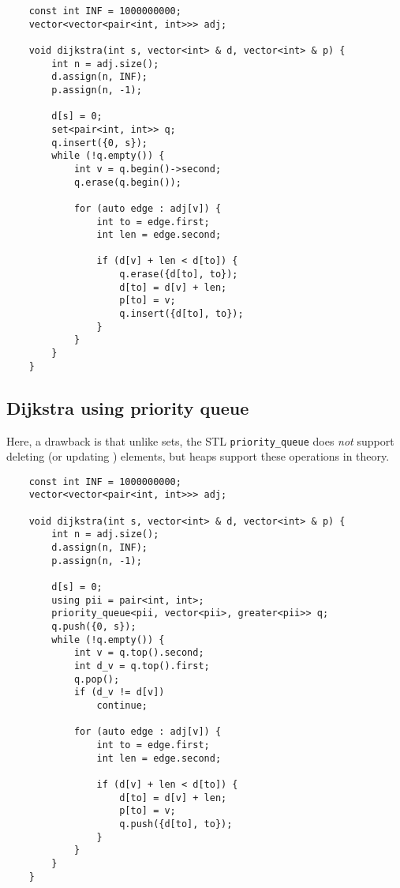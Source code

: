 \documentclass[12pt,a4paper]{amsart}
\numberwithin{equation}{section}
\theoremstyle{definition}
\begin{document}
\begin{lstlisting}
    const int INF = 1000000000;
    vector<vector<pair<int, int>>> adj;

    void dijkstra(int s, vector<int> & d, vector<int> & p) {
        int n = adj.size();
        d.assign(n, INF);
        p.assign(n, -1);

        d[s] = 0;
        set<pair<int, int>> q;
        q.insert({0, s});
        while (!q.empty()) {
            int v = q.begin()->second;
            q.erase(q.begin());
    
            for (auto edge : adj[v]) {
                int to = edge.first;
                int len = edge.second;
    
                if (d[v] + len < d[to]) {
                    q.erase({d[to], to});
                    d[to] = d[v] + len;
                    p[to] = v;
                    q.insert({d[to], to});
                }
            }
        }
    }
\end{lstlisting}

\subsection{Dijkstra using priority queue} Here, a drawback is that unlike sets, the STL \verb|priority_queue| does \textit{not} support deleting (or updating ) elements, but heaps support these operations in theory. 

\begin{lstlisting}
    const int INF = 1000000000;
    vector<vector<pair<int, int>>> adj;

    void dijkstra(int s, vector<int> & d, vector<int> & p) {
        int n = adj.size();
        d.assign(n, INF);
        p.assign(n, -1);

        d[s] = 0;
        using pii = pair<int, int>;
        priority_queue<pii, vector<pii>, greater<pii>> q;
        q.push({0, s});
        while (!q.empty()) {
            int v = q.top().second;
            int d_v = q.top().first;
            q.pop();
            if (d_v != d[v])
                continue;

            for (auto edge : adj[v]) {
                int to = edge.first;
                int len = edge.second;

                if (d[v] + len < d[to]) {
                    d[to] = d[v] + len;
                    p[to] = v;
                    q.push({d[to], to});
                }
            }
        }
    }
\end{lstlisting}
\end{document}
